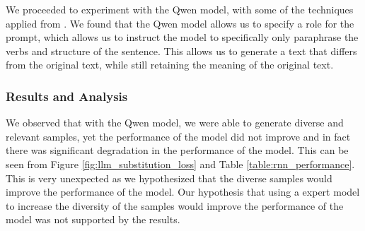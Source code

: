 \documentclass{article}
\begin{document}
We proceeded to experiment with the Qwen model, with some of the techniques
applied from \cite{promptingguide}. We found that the Qwen model allows us to
specify a role for the prompt, which allows us to instruct the model to
specifically only paraphrase the verbs and structure of the sentence. This
allows us to generate a text that differs from the original text, while still
retaining the meaning of the original text.

\subsubsection{Results and Analysis}

We observed that with the Qwen model, we were able to generate diverse and
relevant samples, yet the performance of the model did not improve and in fact
there was significant degradation in the performance of the model. This can
be seen from Figure \ref{fig:llm_substitution_loss} and Table \ref{table:rnn_performance}.
This is very
unexpected as we hypothesized that the diverse samples would improve the
performance of the model. Our hypothesis that using a expert model to increase
the diversity of the samples would improve the performance of the model was
not supported by the results.
\end{document}
